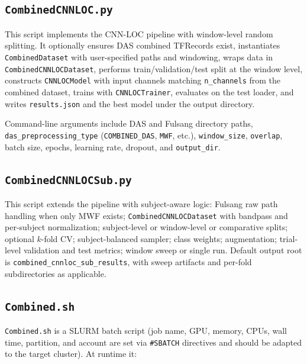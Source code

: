 \documentclass[11pt,a4paper]{article}
\newcommand{\py}[1]{\texttt{#1}}
\begin{document}
\subsection{\py{CombinedCNNLOC.py}}

This script implements the CNN-LOC pipeline with window-level random splitting. It optionally ensures DAS combined TFRecords exist, instantiates \py{CombinedDataset} with user-specified paths and windowing, wraps data in \py{CombinedCNNLOCDataset}, performs train/validation/test split at the window level, constructs \py{CNNLOCModel} with input channels matching \texttt{n\_channels} from the combined dataset, trains with \py{CNNLOCTrainer}, evaluates on the test loader, and writes \py{results.json} and the best model under the output directory.

Command-line arguments include DAS and Fulsang directory paths, \texttt{das\_preprocessing\_type} (\texttt{COMBINED\_DAS}, \texttt{MWF}, etc.), \texttt{window\_size}, \texttt{overlap}, batch size, epochs, learning rate, dropout, and \texttt{output\_dir}.

\subsection{\py{CombinedCNNLOCSub.py}}

This script extends the pipeline with subject-aware logic: Fulsang raw path handling when only MWF exists; \py{CombinedCNNLOCDataset} with bandpass and per-subject normalization; subject-level or window-level or comparative splits; optional $k$-fold CV; subject-balanced sampler; class weights; augmentation; trial-level validation and test metrics; window sweep or single run. Default output root is \py{combined\_cnnloc\_sub\_results}, with sweep artifacts and per-fold subdirectories as applicable.

\subsection{\py{Combined.sh}}

\py{Combined.sh} is a SLURM batch script (job name, GPU, memory, CPUs, wall time, partition, and account are set via \texttt{\#SBATCH} directives and should be adapted to the target cluster). At runtime it:
\end{document}
